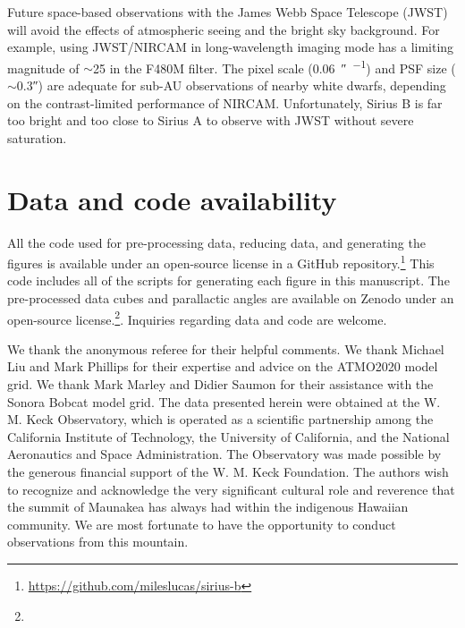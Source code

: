 \documentclass[twocolumn]{aastex631}
\begin{document}
Future space-based observations with the James Webb Space Telescope (JWST) will avoid the effects of atmospheric seeing and the bright sky background. For example, using JWST/NIRCAM in long-wavelength imaging mode has a limiting magnitude of $\sim$25 in the F480M filter. The pixel scale (\qty{0.06}{\arcsecond\per\pixel}) and PSF size ($\sim$\ang{;;0.3}) are adequate for sub-AU observations of nearby white dwarfs, depending on the contrast-limited performance of NIRCAM. Unfortunately, Sirius B is far too bright and too close to Sirius A to observe with JWST without severe saturation.

\section{Data and code availability}\label{sec:data}

All the code used for pre-processing data, reducing data, and generating the figures is available under an open-source license in a GitHub repository.\footnote{\url{https://github.com/mileslucas/sirius-b}} This code includes all of the scripts for generating each figure in this manuscript. The pre-processed data cubes and parallactic angles are available on Zenodo under an open-source license.\footnote{}. Inquiries regarding data and code are welcome.

\begin{acknowledgements}
We thank the anonymous referee for their helpful comments. We thank Michael Liu and Mark Phillips for their expertise and advice on the ATMO2020 model grid. We thank Mark Marley and Didier Saumon for their assistance with the Sonora Bobcat model grid. The data presented herein were obtained at the W. M. Keck Observatory, which is operated as a scientific partnership among the California Institute of Technology, the University of California, and the National Aeronautics and Space Administration. The Observatory was made possible by the generous financial support of the W. M. Keck Foundation. The authors wish to recognize and acknowledge the very significant cultural role and reverence that the summit of Maunakea has always had within the indigenous Hawaiian community. We are most fortunate to have the opportunity to conduct observations from this mountain.
\end{acknowledgements}



\end{document}
